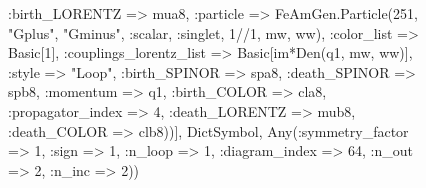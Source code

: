 \documentclass{revtex4}
\begin{document}
\begin{figure}[!htb]
\begin{center}
{:birth_LORENTZ => mua8, :particle => FeAmGen.Particle(251, "Gplus", "Gminus", :scalar, :singlet, 1//1, mw, ww), :color_list => Basic[1], :couplings_lorentz_list => Basic[im*Den(q1, mw, ww)], :style => "Loop", :birth_SPINOR => spa8, :death_SPINOR => spb8, :momentum => q1, :birth_COLOR => cla8, :propagator_index => 4, :death_LORENTZ => mub8, :death_COLOR => clb8))], Dict{Symbol, Any}(:symmetry_factor => 1, :sign => 1, :n_loop => 1, :diagram_index => 64, :n_out => 2, :n_inc => 2)) 
}
\end{center}
\end{figure}
\end{document}
